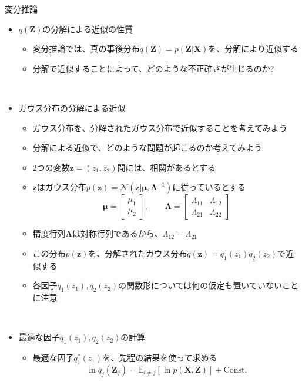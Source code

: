\documentclass[dvipdfmx,notheorems,t]{beamer}
\begin{document}
\begin{frame}{変分推論}

\begin{itemize}
	\item $q(\bm{Z})$の分解による近似の性質
	\begin{itemize}
		\item 変分推論では、真の事後分布$q(\bm{Z}) = p(\bm{Z} | \bm{X})$を、分解により近似する
		\item 分解で近似することによって、\alert{どのような不正確さが生じるのか?}
	\end{itemize} \
	
	\item ガウス分布の分解による近似
	\begin{itemize}
		\item ガウス分布を、\alert{分解されたガウス分布}で近似することを考えてみよう
		\item 分解による近似で、どのような問題が起こるのか考えてみよう
		\newline
		\item 2つの変数$\bm{z} = (z_1, z_2)$間には、\alert{相関がある}とする
		\item $\bm{z}$はガウス分布$p(\bm{z}) = \mathcal{N}(\bm{z} | \bm{\mu}, \bm{\Lambda}^{-1})$に従っているとする
		\begin{equation}
			\bm{\mu} = \left[ \begin{array}{l} \mu_1 \\ \mu_2 \end{array} \right], \qquad \bm{\Lambda} = \left[ \begin{array}{ll} \Lambda_{11} & \Lambda_{12} \\ \Lambda_{21} & \Lambda_{22} \end{array} \right]
		\end{equation}
		
		\item 精度行列$\bm{\Lambda}$は対称行列であるから、$\Lambda_{12} = \Lambda_{21}$
		\newline
		\item この分布$p(\bm{z})$を、分解されたガウス分布$q(\bm{z}) = q_1(z_1) q_2(z_2)$で近似する
		\item 各因子$q_1(z_1), q_2(z_2)$の関数形については\alert{何の仮定も置いていない}ことに注意
	\end{itemize} \
	
	\item 最適な因子$q_1(z_1), q_2(z_2)$の計算
	\begin{itemize}
		\item 最適な因子$q_1^*(z_1)$を、先程の結果を使って求める
		\begin{equation}
			\ln q_j(\bm{Z}_j) = \mathbb{E}_{i \neq j}[\ln p(\bm{X}, \bm{Z})] + \mathrm{Const.}
		\end{equation}
		

\end{itemize}
\end{itemize}
\end{frame}
\end{document}
